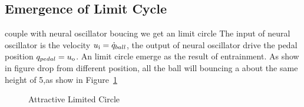 \subsection*{Emergence of Limit Cycle}
couple with neural oscillator boucing we get an limit circle
The input of neural oscillator is the velocity $u_{\mathrm{i}}=\dot{q}_{ball}$, the output of neural oscillator  drive the pedal position $q_{pedal}=u_{\mathrm{o}}$.
An limit circle emerge as the result of entrainment.
As show in figure drop from different position, all the ball will bouncing a about the same height of 5,as show in Figure~\ref{fig:bb_attractive_circle}

\begin{figure}[h]
\begin{center}
	
\end{center}
\caption{Attractive Limited Circle}
\label{fig:bb_attractive_circle}
\end{figure}
